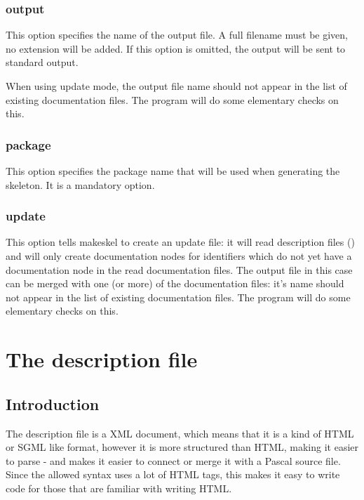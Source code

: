 \subsection{output}
\label{suse:msoutput}
This option specifies the name of the output file. A full filename must be
given, no extension will be added. If this option is omitted, the output
will be sent to standard output.

When using update mode, the output file name should not appear in the list of
existing documentation files. The  program will do some
elementary checks on this.

\subsection{package}
\label{suse:mspackage}
This option specifies the package name that will be used when generating the
skeleton. It is a mandatory option. 

\subsection{update}
\label{suse:update}
This option tells makeskel to create an update file: it will read
description files () and will only create documentation nodes
for identifiers which do not yet have a documentation node in the read
documentation files. The output file in this case can be merged with one (or
more) of the documentation files: it's name should not appear in the list of
existing documentation files. The  program will do some
elementary checks on this.

\chapter{The description file}
\label{ch:descriptionfile}

\section{Introduction}
The description file is a XML document, which means that it is a kind of
HTML or SGML like format, however it is more structured than HTML, making it
easier to parse - and makes it easier to connect or merge it with a Pascal
source file. Since the allowed syntax uses a lot of HTML tags, this makes 
it easy to write code for those that are familiar with writing HTML.

